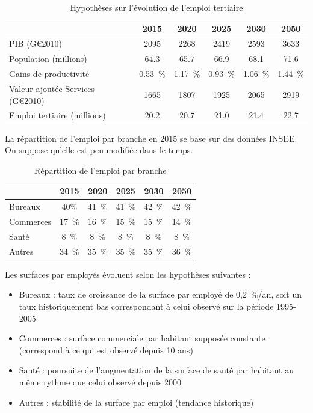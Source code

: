 \documentclass[10.5pt,a4paper]{article}
\begin{document}
{\begin{table}[h!]
\caption{Hypothèses sur l'évolution de l'emploi tertiaire}
\begin{center}
\begin{tabular}{|l|c|c|c|c|c|}
\hline
							& 2015	& 2020	& 2025	& 2030	& 2050 \\
\hline
PIB (G€2010)	& 2095	& 2268	& 2419	& 2593	& 3633 \\
Population (millions) & 	64.3	& 65.7	& 66.9	& 68.1	& 71.6 \\
Gains de productivité	& 0.53~\%	& 1.17~\%	& 0.93~\%	& 1.06~\%	& 1.44~\% \\
Valeur ajoutée Services (G€2010) & 	1665	& 1807	& 1925	& 2065	& 2919 \\
Emploi tertiaire (millions)	& 20.2	& 20.7	& 21.0	& 21.4	& 22.7 \\
\hline
\end{tabular}
\end{center}
\end{table}

La répartition de l’emploi par branche en 2015 se base sur des données INSEE. On suppose qu'elle est peu modifiée dans le temps.

\begin{table}[h!]
\caption{Répartition de l'emploi par branche}
\begin{center}
\begin{tabular}{|l|c|c|c|c|c|}
\hline
							& 2015	& 2020	& 2025	& 2030	& 2050 \\
							\hline
Bureaux				&	40\%	& 41~\%	& 41~\% & 42~\%	&42~\% \\
Commerces			& 17~\% &	16~\%	& 15~\%	& 15~\% & 14~\% \\ 
Santé					& 8~\%	& 8~\%	& 8~\%  & 8~\%	&8~\% \\
Autres				& 34~\%	& 35~\% &	35~\% &	35~\% &	36~\% \\
\hline
\end{tabular}
\end{center}
\end{table}

Les surfaces par employés évoluent selon les hypothèses suivantes :  
\begin{itemize}
\item Bureaux : taux de croissance de la surface par employé de 0,2~\%/an, soit un taux historiquement bas correspondant à celui observé sur la période 1995-2005
\item Commerces : surface commerciale par habitant supposée constante (correspond à ce qui est observé depuis 10 ans)
\item Santé : poursuite de l’augmentation de la surface de santé par habitant au même rythme que celui observé depuis 2000
\item Autres : stabilité de la surface par emploi (tendance historique)
\end{itemize}

}
\end{document}
